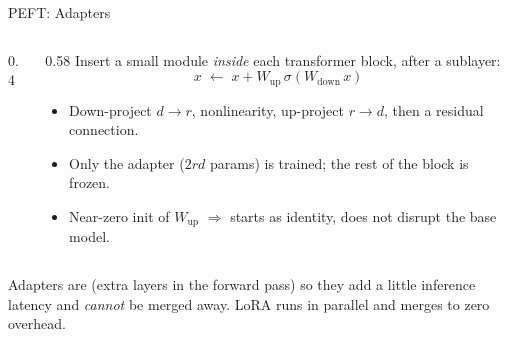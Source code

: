 \begin{frame}{PEFT: Adapters}
\begin{columns}[T]
\begin{column}{0.4\textwidth}
\begin{center}
      \end{center}
    \end{column}
    \begin{column}{0.58\textwidth}
      Insert a small  module \emph{inside} each transformer block, after a sublayer:
      \[
        x \;\leftarrow\; x + W_{\text{up}}\,\sigma\!\left(W_{\text{down}}\, x\right)
      \]
      \begin{itemize}[nosep]
        \item Down-project $d \to r$, nonlinearity, up-project $r \to d$, then a residual connection.
        \item Only the adapter ($2rd$ params) is trained; the rest of the block is frozen.
        \item Near-zero init of $W_{\text{up}}$ $\Rightarrow$ starts as identity, does not disrupt the base model.
      \end{itemize}
    \end{column}
  \end{columns}

  \vspace{0.4em}
  \begin{description}[nosep]
    \item[vs.\ LoRA:] Adapters are  (extra layers in the forward pass) so they add
      a little inference latency and \emph{cannot} be merged away. LoRA runs in parallel and merges to zero overhead.
  \end{description}
\end{frame}

